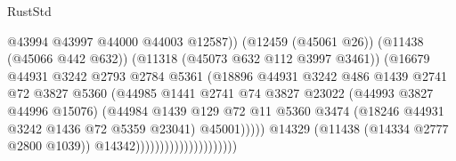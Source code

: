 \begin{lexlean}{RustStd}
\begin{coremodule}
                                                    @43994
                                                    @43997
                                                    @44000
                                                    @44003
                                                    @12587))
                                                (@12459 (@45061 @26))
                                                (@11438 (@45066 @442 @632))
                                                (@11318 (@45073 @632 @112 @3997 @3461))
                                                (@16679
                                                  @44931
                                                  @3242
                                                  @2793
                                                  @2784
                                                  @5361
                                                  (@18896
                                                    @44931
                                                    @3242
                                                    @486
                                                    @1439
                                                    @2741
                                                    @72
                                                    @3827
                                                    @5360
                                                    (@44985
                                                      @1441
                                                      @2741
                                                      @74
                                                      @3827
                                                      @23022
                                                      (@44993 @3827 @44996 @15076)
                                                      (@44984
                                                        @1439
                                                        @129
                                                        @72
                                                        @11
                                                        @5360
                                                        @3474
                                                        (@18246 @44931 @3242 @1436 @72 @5359 @23041)
                                                        @45001)))))
                                              @14329
                                              (@11438 (@14334 @2777 @2800 @1039))
                                              @14342)))))))))))))))))))))

\end{coremodule}
\end{lexlean}
